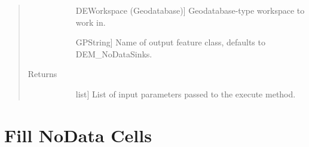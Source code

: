 \documentclass[letterpaper,10pt,english]{sphinxmanual}
\begin{document}
\begin{fulllineitems}
\begin{fulllineitems}
\begin{quote}
\begin{description}
\begin{description}
\item[{}] \leavevmode{[}DEWorkspace (Geodatabase){]}
Geodatabase-type workspace to work in.

\item[{}] \leavevmode{[}GPString{]}
Name of output feature class, defaults to DEM\_NoDataSinks.

\end{description}

\item[{Returns}] \leavevmode\begin{description}
\item[{}] \leavevmode{[}list{]}
List of input parameters passed to the execute method.

\end{description}

\end{description}\end{quote}

\end{fulllineitems}


\end{fulllineitems}



\section{Fill NoData Cells}
\label{\detokenize{StreamStats_DataPrep:fill-nodata-cells}}
\end{document}
